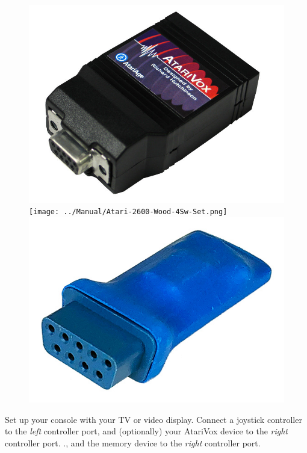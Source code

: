 \documentclass[10pt,twocolumn,openany,article]{memoir}
\begin{document}
\ifdefined\NOSAVE\else
\begin{figure}[b]
  \begin{center}
    \includegraphics[width=\columnwidth]{../Manual/AtariVox.jpeg}
    \ifdefined\ATARIAGESAVE
    \texttt{[image: ../Manual/Atari-2600-Wood-4Sw-Set.png]}
    \else
    \includegraphics[width=\columnwidth]{../Manual/SaveKey.jpeg}
    \fi
  \end{center}
\end{figure}
\fi

Set up  your console with your  TV or video display.  Connect a joystick
controller  to the  \emph{left} controller  port\ifdefined\ATARIAGESAVE,
and  (optionally) your  AtariVox device  to the  \emph{right} controller
port.  \else\ifdefined\NOSAVE.\else{},  and  the memory  device  to  the
\emph{right} controller port.
\end{document}
